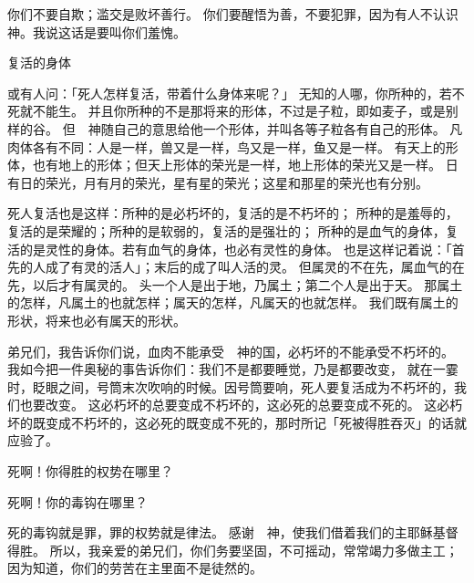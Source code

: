 {\par }{\MM {}你们不要自欺；滥交是败坏善行。
你们要醒悟为善，不要犯罪，因为有人不认识　神。我说这话是要叫你们羞愧。
\par }{\SH 复活的身体
\par }{\PP {}或有人问：「死人怎样复活，带着什么身体来呢？」
无知的人哪，你所种的，若不死就不能生。
并且你所种的不是那将来的形体，不过是子粒，即如麦子，或是别样的谷。
但　神随自己的意思给他一个形体，并叫各等子粒各有自己的形体。
凡肉体各有不同：人是一样，兽又是一样，鸟又是一样，鱼又是一样。
有天上的形体，也有地上的形体；但天上形体的荣光是一样，地上形体的荣光又是一样。
日有日的荣光，月有月的荣光，星有星的荣光；这星和那星的荣光也有分别。
\par }{\PP {}死人复活也是这样：所种的是必朽坏的，复活的是不朽坏的；
所种的是羞辱的，复活的是荣耀的；所种的是软弱的，复活的是强壮的；
所种的是血气的身体，复活的是灵性的身体。若有血气的身体，也必有灵性的身体。
也是这样记着说：「首先的人{}成了有灵的活人」；末后的{}成了叫人活的灵。
但属灵的不在先，属血气的在先，以后才有属灵的。
头一个人是出于地，乃属土；第二个人是出于天。
那属土的怎样，凡属土的也就怎样；属天的怎样，凡属天的也就怎样。
我们既有属土的形状，将来也必有属天的形状。
\par }{\PP {}弟兄们，我告诉你们说，血肉{}不能承受　神的国，必朽坏的不能承受不朽坏的。
我如今把一件奥秘的事告诉你们：我们不是都要睡觉，乃是都要改变，
就在一霎时，眨眼之间，号筒末次吹响的时候。因号筒要响，死人要复活成为不朽坏的，我们也要改变。
这必朽坏的总要变成不朽坏的，这必死的总要变成不死的。
这必朽坏的既变成不朽坏的，这必死的既变成不死的，那时{}所记「死被得胜吞灭」的话就应验了。
\par }{\Q {}死啊！你得胜的权势在哪里？
\par }{\Q 死啊！你的毒钩在哪里？
\par }{\MM {}死的毒钩就是罪，罪的权势就是律法。
感谢　神，使我们借着我们的主耶稣基督得胜。
所以，我亲爱的弟兄们，你们务要坚固，不可摇动，常常竭力多做主工；因为知道，你们的劳苦在主里面不是徒然的。

}

